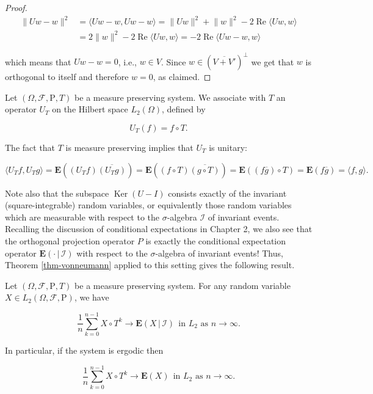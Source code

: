 \begin{proof}
\begin{align*}
\lVert Uw-w \rVert^2 &= \langle Uw-w, Uw-w\rangle = \lVert Uw \rVert^2 + \lVert w \rVert^2 - 2\operatorname{Re} \langle Uw,w\rangle  \\ &=
2\lVert w \rVert^2 - 2\operatorname{Re} \langle Uw,w\rangle
= - 2\operatorname{Re} \langle Uw-w,w\rangle
\end{align*}

\noindent which means that $Uw-w = 0$, i.e., $w\in V$. Since
$w\in \left(\overline{V+V'}\right)^\perp$ we get that
$w$ is orthogonal to itself and therefore $w=0$, as
claimed.
\end{proof}

\noindent Let $(\Omega, \mathcal{F}, \mathrm{P}, T)$ be a
measure preserving system. We associate with $T$ an
operator $U_T$ on the Hilbert space $L_2(\Omega)$,
defined  by

\[
U_T(f) = f\circ T.
\]

\noindent The fact that $T$ is measure preserving implies that
$U_T$ is unitary:

\[
\langle U_T f, U_T g \rangle = \mathbf{E}( (U_T f) \overline{(U_T g)} )
= \mathbf{E}( (f\circ T) \overline{(g\circ T)} )
= \mathbf{E}( (f\overline{g})\circ T ) = \mathbf{E}( f\overline{g} ) = \langle f,g\rangle.
\]

\noindent Note also that the subspace $\operatorname{Ker}(U-I)$
consists exactly of the invariant (square-integrable)
random variables, or equivalently those random
variables which are measurable with respect to the
$\sigma$-algebra $\mathcal{I}$ of invariant events.
Recalling the discussion of conditional expectations
in Chapter 2, we also see that the orthogonal
projection operator $P$ is exactly the conditional
expectation operator
$\mathbf{E}\left(\cdot\,|\,\mathcal{I}\right)$ with
respect to the $\sigma$-algebra of invariant events!
Thus, Theorem \ref{thm-vonneumann} applied to this setting
gives the following result.

\begin{thm}
Let $(\Omega, \mathcal{F}, \mathrm{P}, T)$ be a
measure preserving system. For any random variable
$X\in L_2(\Omega, \mathcal{F}, \mathrm{P})$, we have

\[
\frac{1}{n} \sum_{k=0}^{n-1} X\circ T^{k} \to \mathbf{E}\left(X\,|\,\mathcal{I}\right)\ \ \textrm{in $L_2$ as }n\to\infty.
\]

\noindent In particular, if the system is ergodic then

\[
\frac{1}{n} \sum_{k=0}^{n-1} X\circ T^{k} \to \mathbf{E}(X)\ \ \textrm{in $L_2$ as }n\to\infty.
\]

\end{thm}

